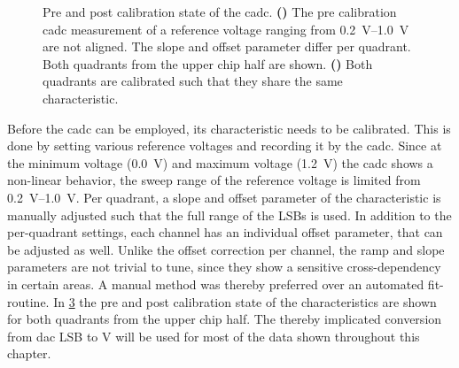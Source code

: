 \begin{figure}[htb!]
	\begin{subfigure}{0.65\textwidth}
		\caption{}
		\vspace{-0.4cm}
		
		\label{precadccalib}
		\vspace{0.4cm}
	\end{subfigure}
	\begin{subfigure}{0.35\textwidth}
		\caption{}
		
		\label{postcadccalib}
	\end{subfigure}
	\caption[Pre and post calibration state of the \gls{cadc}.]{Pre and post calibration state of the \gls{cadc}. \textbf{()} The pre calibration \gls{cadc} measurement of a reference voltage ranging from \SIrange{0.2}{1.0}{\V} are not aligned. The slope and offset parameter differ per quadrant. Both quadrants from the upper chip half are shown. \textbf{()} Both quadrants are calibrated such that they share the same characteristic.}
	\label{cadccalibration}
\end{figure}
Before the \gls{cadc} can be employed, its characteristic needs to be calibrated. This is done by setting various reference voltages and recording it by the \gls{cadc}. Since at the minimum voltage (\SI{0.0}{\V}) and maximum voltage (\SI{1.2}{\V}) the \gls{cadc} shows a non-linear behavior, the sweep range of the reference voltage is limited from \SIrange{0.2}{1.0}{\V}. Per quadrant, a slope and offset parameter of the characteristic is manually adjusted such that the full range of the LSBs is used. In addition to the per-quadrant settings, each channel has an individual offset parameter, that can be adjusted as well. Unlike the offset correction per channel, the ramp and slope parameters are not trivial to tune, since they show a sensitive cross-dependency in certain areas. A manual method was thereby preferred over an automated fit-routine. In \cref{cadccalibration} the pre and post calibration state of the characteristics are shown for both quadrants from the upper chip half. The thereby implicated conversion from \gls{dac} LSB to \si{\V} will be used for most of the data shown throughout this chapter.

